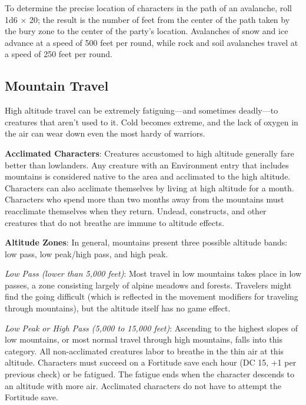 To determine the precise location of characters in the path of an avalanche, roll 1d6 \mbox{$\times$} 20; the result is the number of feet from the center of the path taken by the bury zone to the center of the party's location. Avalanches of snow and ice advance at a speed of 500 feet per round, while rock and soil avalanches travel at a speed of 250 feet per round.
				
\subsection{Mountain Travel}

				
High altitude travel can be extremely fatiguing---and sometimes deadly---to creatures that aren't used to it. Cold becomes extreme, and the lack of oxygen in the air can wear down even the most hardy of warriors.
				
\textbf{Acclimated Characters}: Creatures accustomed to high altitude generally fare better than lowlanders. Any creature with an Environment entry that includes mountains is considered native to the area and acclimated to the high altitude. Characters can also acclimate themselves by living at high altitude for a month. Characters who spend more than two months away from the mountains must reacclimate themselves when they return. Undead, constructs, and other creatures that do not breathe are immune to altitude effects.
				
\textbf{Altitude Zones}: In general, mountains present three possible altitude bands: low pass, low peak/high pass, and high peak. 
				
\textit{Low Pass (lower than 5,000 feet)}: Most travel in low mountains takes place in low passes, a zone consisting largely of alpine meadows and forests. Travelers might find the going difficult (which is reflected in the movement modifiers for traveling through mountains), but the altitude itself has no game effect.
				
\textit{Low Peak or High Pass (5,000 to 15,000 feet)}: Ascending to the highest slopes of low mountains, or most normal travel through high mountains, falls into this category. All non-acclimated creatures labor to breathe in the thin air at this altitude. Characters must succeed on a Fortitude save each hour (DC 15, +1 per previous check) or be fatigued. The fatigue ends when the character descends to an altitude with more air. Acclimated characters do not have to attempt the Fortitude save. 
				
